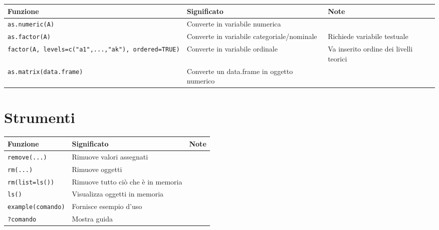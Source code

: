 \documentclass[
  a4paper,
  DIV=11,
  numbers=noendperiod]{scrreprt}
\begin{document}
\begin{longtable}[]{@{}
  >{\raggedright\arraybackslash}p{}
  >{\raggedright\arraybackslash}p{}
  >{\raggedright\arraybackslash}p{}@{}}
\toprule\noalign{}
\begin{minipage}[b]{\linewidth}\raggedright
Funzione
\end{minipage} & \begin{minipage}[b]{\linewidth}\raggedright
Significato
\end{minipage} & \begin{minipage}[b]{\linewidth}\raggedright
Note
\end{minipage} \\
\midrule\noalign{}
\endhead
\bottomrule\noalign{}
\endlastfoot
\texttt{as.numeric(A)} & Converte in variabile numerica & \\
\texttt{as.factor(A)} & Converte in variabile categoriale/nominale &
Richiede variabile testuale \\
\texttt{factor(A,\ levels=c("a1",...,"ak"),\ ordered=TRUE)} & Converte
in variabile ordinale & Va inserito ordine dei livelli teorici \\
\texttt{as.matrix(data.frame)} & Converte un data.frame in oggetto
numerico & \\
\end{longtable}

\section{Strumenti}\label{strumenti}

\begin{longtable}[]{@{}lll@{}}
\toprule\noalign{}
Funzione & Significato & Note \\
\midrule\noalign{}
\endhead
\bottomrule\noalign{}
\endlastfoot
\texttt{remove(...)} & Rimuove valori assegnati & \\
\texttt{rm(...)} & Rimuove oggetti & \\
\texttt{rm(list=ls())} & Rimuove tutto ciò che è in memoria & \\
\texttt{ls()} & Visualizza oggetti in memoria & \\
\texttt{example(comando)} & Fornisce esempio d'uso & \\
\texttt{?comando} & Mostra guida & \\
\end{longtable}
\end{document}
